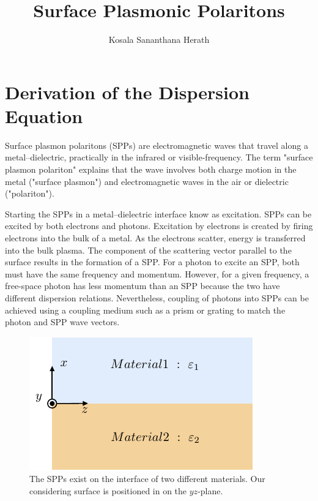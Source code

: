 \documentclass[a4paper]{article}
\title{Surface Plasmonic Polaritons}
\author{Kosala Sananthana Herath}
\numberwithin{equation}{subsection}
\numberwithin{equation}{section}
\begin{document}
\maketitle

\section*{Derivation of the Dispersion Equation}

Surface plasmon polaritons (SPPs) are electromagnetic waves that travel along a metal–dielectric, practically in the infrared or visible-frequency. The term "surface plasmon polariton" explains that the wave involves both charge motion in the metal ("surface plasmon") and electromagnetic waves in the air or dielectric ("polariton").

Starting the SPPs in a metal–dielectric interface know as excitation. SPPs can be excited by both electrons and photons. Excitation by electrons is created by firing electrons into the bulk of a metal. As the electrons scatter, energy is transferred into the bulk plasma. The component of the scattering vector parallel to the surface results in the formation of a SPP. For a photon to excite an SPP, both must have the same frequency and momentum. However, for a given frequency, a free-space photon has less momentum than an SPP because the two have different dispersion relations. Nevertheless, coupling of photons into SPPs can be achieved using a coupling medium such as a prism or grating to match the photon and SPP wave vectors.
\begin{figure}[ht!]
  \centering
  \includegraphics{figures/fig1}
  \caption{The SPPs exist on the interface of two different materials. Our considering surface is positioned in on the $yz$-plane.}
\end{figure}
\end{document}
